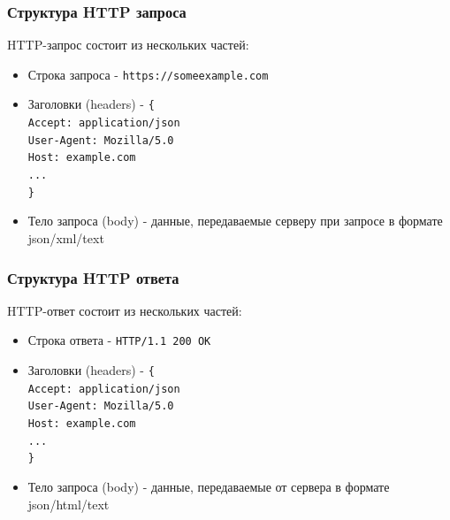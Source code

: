 \documentclass[aspectratio=169]{beamer}
\begin{document}

\begin{frame}
  \frametitle{Структура HTTP запроса}
\begin{center}
  HTTP-запрос состоит из нескольких частей:
  \begin{itemize}
  \item Строка запроса - \texttt{https://someexample.com}
  \item Заголовки (headers) - \texttt{\{ \\
        Accept: application/json \\
        User-Agent: Mozilla/5.0 \\
        Host: example.com \\
        ... \\
      \}}
    
  \item Тело запроса (body) - данные, передаваемые серверу при запросе в формате json/xml/text
    
  \end{itemize}
\end{center}
\end{frame}


\begin{frame}
  \frametitle{Структура HTTP ответа}

  \begin{center}
  HTTP-ответ состоит из нескольких частей:
  \begin{itemize}
  \item Строка ответа - \texttt{HTTP/1.1 200 OK}
  \item Заголовки (headers) - \texttt{\{ \\
        Accept: application/json \\
        User-Agent: Mozilla/5.0 \\
        Host: example.com \\
        ... \\
      \}}
    
  \item Тело запроса (body) - данные, передаваемые от сервера в формате json/html/text
    
  \end{itemize}
\end{center}
  
\end{frame}

\end{document}
